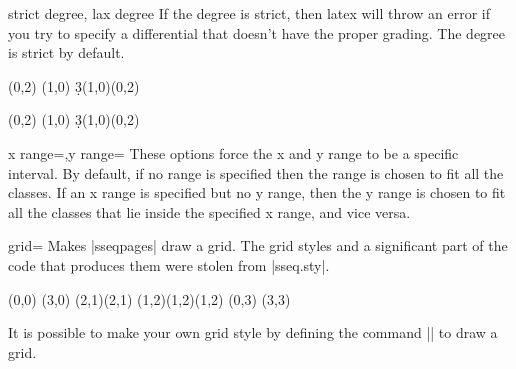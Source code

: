 \documentclass{ltxdoc}
\begin{document}
\begin{sseqdata}[name=ex1,degree={#1}{1-#1}]
\begin{keylist}{strict degree, lax degree}
If the degree is strict, then latex will throw an error if you try to specify a differential that doesn't have the proper grading. The degree is strict by default.
\begin{codeexample}
\begin{sseqdata}[name=laxdegree,Adams grading]
\class(0,2)
\class(1,0)
\d3(1,0)(0,2) %
\end{sseqdata}
\end{codeexample}

\begin{codeexample}[]
\begin{sseqdata}[name=laxdegree,Adams grading, lax degree]
\class(0,2)
\class(1,0)
\d3(1,0)(0,2) %
\end{sseqdata}
\printpage[name=laxdegree,page=3]
\end{codeexample}
\end{keylist}

\begin{keylist}{x range=,y range=}
These options force the x and y range to be a specific interval. By default, if no range is specified then the range is chosen to fit all the classes. If an x range is specified but no y range, then the y range is chosen to fit all the classes that lie inside the specified x range, and vice versa.
\end{keylist}

\begin{key}{grid=}
Makes |sseqpages| draw a grid. The grid styles and a significant part of the code that produces them were stolen from |sseq.sty|.
\begin{codeexample}[]
\begin{sseqdata}[name=grid example]
\class(0,0)
\class(3,0)
\class(2,1)\class(2,1)
\class(1,2)\class(1,2)\class(1,2)
\class(0,3)
\class(3,3)
\end{sseqdata}
\vbox{
\printpage[name=grid example,grid=chess]
\printpage[name=grid example,grid=crossword]
\printpage[name=grid example,grid=dots]
\newline
\printpage[name=grid example,grid=go]
\printpage[name=grid example,grid=none]
}
\end{codeexample}
It is possible to make your own grid style by defining the command |\sseq@grid@yourgridname| to draw a grid.
\end{key}


\end{sseqdata}
\end{document}
